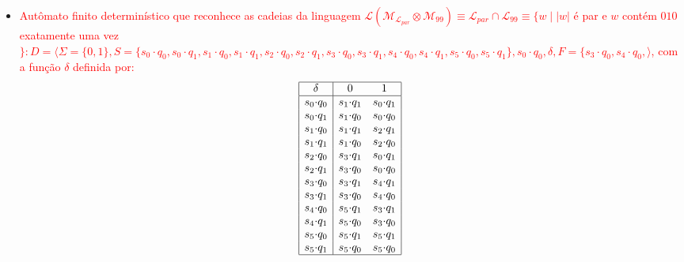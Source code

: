 \documentclass[12pt]{article}
\def\myling{{99}} %
\begin{document}
\begin{itemize}
\begin{center}
\end{center}
  \item  \textcolor{red}{Autômato finito determinístico que reconhece as cadeias da linguagem $\mathcal{L}(\mathcal{M}_{\mathcal{L}_{par}} \otimes \mathcal{M}_\myling) \equiv \mathcal{L}_{par} \cap \mathcal{L}_\myling \equiv \{w\mid |w|$ é par e $w$ contém $010$ exatamente uma vez$\}: D = \langle \Sigma=\{0,1\}, S=\{s_0{\cdot}q_0,s_0{\cdot}q_1,s_1{\cdot}q_0,\allowbreak s_1{\cdot}q_1,s_2{\cdot}q_0,s_2{\cdot}q_1,s_3{\cdot}q_0,s_3{\cdot}q_1,s_4{\cdot}q_0,s_4{\cdot}q_1,s_5{\cdot}q_0,s_5{\cdot}q_1\},s_0{\cdot}q_0, \delta, F=\{s_3{\cdot}q_0,s_4{\cdot}q_0,\rangle$, com a função $\delta$ definida por:}
    $$\begin{array}{|c|cc|}
     \hline
     \delta        & 0             & 1\\
     \hline
     s_0{\cdot}q_0 & s_1{\cdot}q_1 & s_0{\cdot}q_1\\
     s_0{\cdot}q_1 & s_1{\cdot}q_0 & s_0{\cdot}q_0\\
     s_1{\cdot}q_0 & s_1{\cdot}q_1 & s_2{\cdot}q_1\\
     s_1{\cdot}q_1 & s_1{\cdot}q_0 & s_2{\cdot}q_0\\
     s_2{\cdot}q_0 & s_3{\cdot}q_1 & s_0{\cdot}q_1\\
     s_2{\cdot}q_1 & s_3{\cdot}q_0 & s_0{\cdot}q_0\\
     s_3{\cdot}q_0 & s_3{\cdot}q_1 & s_4{\cdot}q_1\\
     s_3{\cdot}q_1 & s_3{\cdot}q_0 & s_4{\cdot}q_0\\
     s_4{\cdot}q_0 & s_5{\cdot}q_1 & s_3{\cdot}q_1\\
     s_4{\cdot}q_1 & s_5{\cdot}q_0 & s_3{\cdot}q_0\\
     s_5{\cdot}q_0 & s_5{\cdot}q_1 & s_5{\cdot}q_1\\
     s_5{\cdot}q_1 & s_5{\cdot}q_0 & s_5{\cdot}q_0\\
     \hline
    \end{array}$$
  

\end{itemize}
\end{document}
